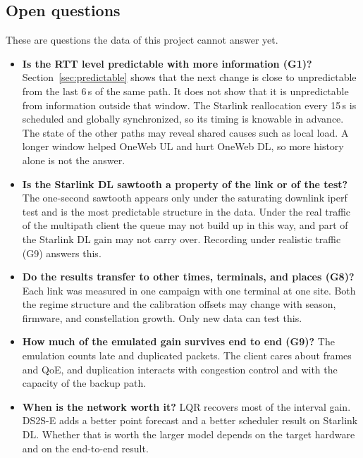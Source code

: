 \subsection{Open questions}
These are questions the data of this project cannot answer yet.
\begin{itemize}[leftmargin=*]
  \item \textbf{Is the RTT level predictable with more information (G1)?} Section~\ref{sec:predictable} shows that the next change is close to unpredictable from the last 6\,s of the same path. It does not show that it is unpredictable from information outside that window. The Starlink reallocation every 15\,s is scheduled and globally synchronized, so its timing is knowable in advance. The state of the other paths may reveal shared causes such as local load. A longer window helped OneWeb UL and hurt OneWeb DL, so more history alone is not the answer.
  \item \textbf{Is the Starlink DL sawtooth a property of the link or of the test?} The one-second sawtooth appears only under the saturating downlink iperf test and is the most predictable structure in the data. Under the real traffic of the multipath client the queue may not build up in this way, and part of the Starlink DL gain may not carry over. Recording under realistic traffic (G9) answers this.
  \item \textbf{Do the results transfer to other times, terminals, and places (G8)?} Each link was measured in one campaign with one terminal at one site. Both the regime structure and the calibration offsets may change with season, firmware, and constellation growth. Only new data can test this.
  \item \textbf{How much of the emulated gain survives end to end (G9)?} The emulation counts late and duplicated packets. The client cares about frames and QoE, and duplication interacts with congestion control and with the capacity of the backup path.
  \item \textbf{When is the network worth it?} LQR recovers most of the interval gain. DS2S-E adds a better point forecast and a better scheduler result on Starlink DL. Whether that is worth the larger model depends on the target hardware and on the end-to-end result.
\end{itemize}

